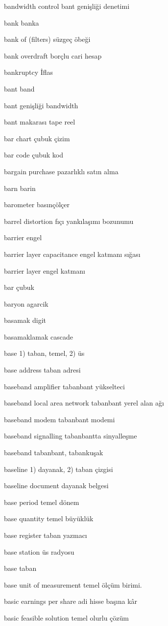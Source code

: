 \documentclass[12pt,fleqn]{article}\usepackage{../../common}
\begin{document}
bandwidth control bant genişliği denetimi

bank banka

bank of (filters) süzgeç öbeği

bank overdraft borçlu cari hesap

bankruptcy İflas

bant band

bant genişliği bandwidth

bant makarası tape reel

bar chart çubuk çizim

bar code çubuk kod

bargain purchase pazarlıklı satın alma

barn barin

barometer basınçölçer

barrel distortion fıçı yankılaşımı bozunumu

barrier engel

barrier layer capacitance engel katmanı sığası

barrier layer engel katmanı

bar çubuk

baryon agarcik

basamak digit

basamaklamak cascade

base 1) taban, temel, 2) üs

base address taban adresi

baseband amplifier tabanbant yükselteci

baseband local area network tabanbant yerel alan ağı

baseband modem tabanbant modemi

baseband signalling tabanbantta sinyalleşme

baseband tabanbant, tabankuşak

baseline 1) dayanak, 2) taban çizgisi

baseline document dayanak belgesi

base period temel dönem

base quantity temel büyüklük

base register taban yazmacı

base station üs radyosu

base taban

base unit of measurement temel ölçüm birimi.

basic earnings per share adi hisse başına kâr

basic feasible solution temel olurlu çözüm
\end{document}
